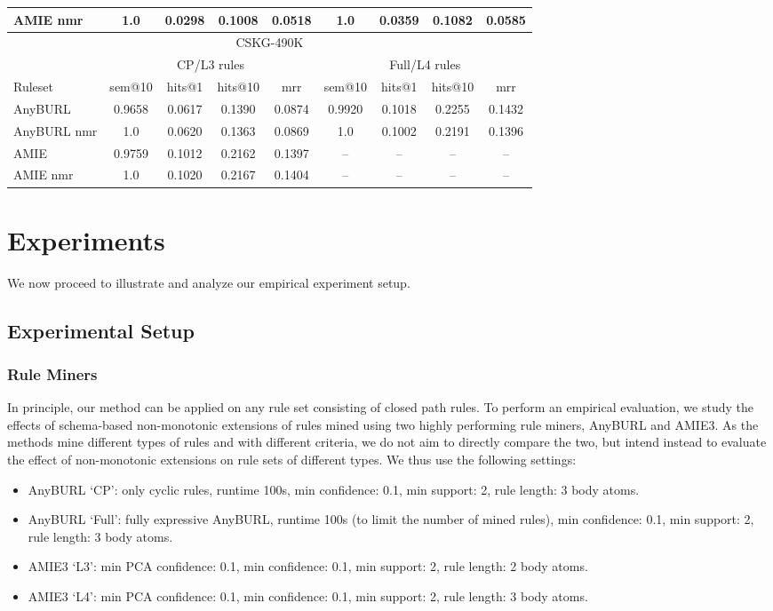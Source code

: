 \documentclass[a4paper,UKenglish,cleveref, autoref, thm-restate]{tgdk-v2021}
\begin{document}
\begin{table}[h]
\begin{tabular}{l | c | c c c | c | c c c}
AMIE nmr & 1.0 & 0.0298 & 0.1008 & 0.0518 & 1.0 & 0.0359 & 0.1082 & 0.0585\\
\midrule
\multicolumn{9}{c}{CSKG-490K} \\
\midrule
& \multicolumn{4}{c|}{CP/L3 rules} & \multicolumn{4}{c}{Full/L4 rules} \\
\cmidrule(lr){2-5} \cmidrule(lr){6-9}
Ruleset & sem@10 & hits@1 & hits@10 & mrr & sem@10 & hits@1 & hits@10 & mrr \\
\midrule
AnyBURL & 0.9658 & 0.0617 & 0.1390 & 0.0874 & 0.9920 & 0.1018 & 0.2255 & 0.1432 \\
AnyBURL nmr & 1.0 & 0.0620 & 0.1363 & 0.0869 & 1.0 & 0.1002 & 0.2191 & 0.1396 \\
AMIE & 0.9759 & 0.1012 & 0.2162 & 0.1397 & -- & -- & -- & --  \\
AMIE nmr & 1.0 & 0.1020 & 0.2167 & 0.1404 & -- & -- & -- & --\\
\bottomrule
\end{tabular}
\end{table}


\section{Experiments} \label{sec:exp}
We now proceed to illustrate and analyze our empirical experiment setup.
\subsection{Experimental Setup}

\subsubsection{Rule Miners} In principle, our method can be applied on any rule set consisting of closed path rules. To perform an empirical evaluation, we study the effects of schema-based non-monotonic extensions of rules mined using two highly performing rule miners, AnyBURL and AMIE3. As the methods mine different types of rules and with different criteria, we do not aim to directly compare the two, but intend instead to evaluate the effect of non-monotonic extensions on rule sets of different types. We thus use the following settings:
\begin{itemize}
    \item AnyBURL `CP': only cyclic rules, runtime 100s, min confidence: 0.1, min support: 2, rule length: 3 body atoms.
    \item AnyBURL `Full': fully expressive AnyBURL, runtime 100s (to limit the number of mined rules), min confidence: 0.1, min support: 2, rule length: 3 body atoms.
    \item AMIE3 `L3': min PCA confidence: 0.1, min confidence: 0.1, min support: 2, rule length: 2 body atoms.
    \item AMIE3 `L4': min PCA confidence: 0.1, min confidence: 0.1, min support: 2, rule length: 3 body atoms.
\end{itemize}
\end{document}
